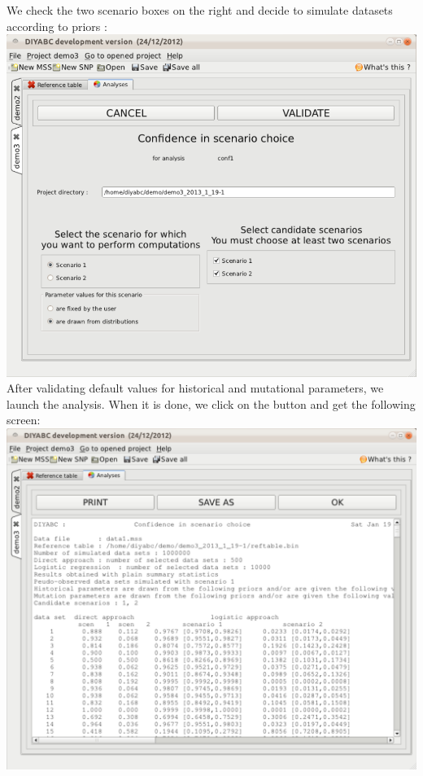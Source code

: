 We check the two scenario boxes on the right and decide to simulate datasets according to priors :\\

\includegraphics[scale=0.38]{gui_pictures/Capture-DIYABC-117.png} \\

After validating default values for historical and mutational parameters, we launch the analysis. When it is done, we click on the  button and get the following screen:\\

\includegraphics[scale=0.38]{gui_pictures/Capture-DIYABC-119.png} \\

